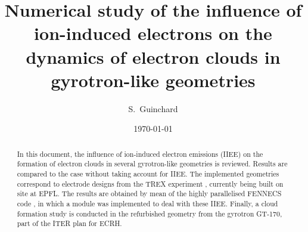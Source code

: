 \documentclass[aps,prc,floatfix,showkeys,nofootinbib]{revtex4-1}
\begin{document}
\title{Numerical study of the influence of ion-induced electrons on the dynamics of electron clouds in gyrotron-like geometries}

\author{S.~Guinchard} 


\date{\today}

\begin{abstract}
In this document, the influence of ion-induced electron emissions (IIEE) on the formation of electron clouds in several gyrotron-like geometries is reviewed. Results are compared to the case without taking account for IIEE. The implemented geometries correspond to electrode designs from the TREX experiment \cite{TREX},  currently being built on site at EPFL. The results are obtained by mean of the highly parallelised FENNECS code \cite{fennecs}, in which a module was implemented to deal with these IIEE. Finally, a cloud formation study is conducted in the refurbished geometry from the gyrotron GT-170, part of the ITER plan for ECRH. 
\end{abstract}

{
\let\clearpage\relax
\maketitle
\sloppy
}




\newpage










\newpage


\end{document}
